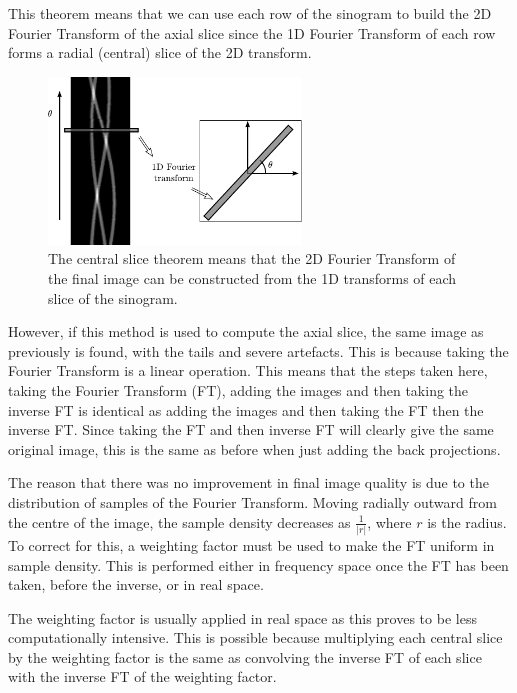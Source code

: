    This theorem means that we can use each row of the sinogram to build the 2D Fourier Transform of the axial slice since the 1D Fourier Transform of each row forms a radial (central) slice of the 2D transform.
    \begin{figure}[ht]
        \begin{center}
            \includegraphics[width=0.6\textwidth]{Files/report_images/central_slice_theorem.pdf}
        \end{center}
        \caption{The central slice theorem means that the 2D Fourier Transform of the final image can be constructed from the 1D transforms of each slice of the sinogram.\label{fig:central_slice_theorem}}
    \end{figure}

    However, if this method is used to compute the axial slice, the same image as previously is found, with the tails and severe artefacts. This is because taking the Fourier Transform is a linear operation. This means that the steps taken here, taking the Fourier Transform (FT), adding the images and then taking the inverse FT is identical as adding the images and then taking the FT then the inverse FT. Since taking the FT and then inverse FT will clearly give the same original image, this is the same as before when just adding the back projections.

    The reason that there was no improvement in  final image quality is due to the distribution of samples of the Fourier Transform. Moving radially outward from the centre of the image, the sample density decreases as $\frac{1}{|r|}$, where $r$ is the radius. To correct for this, a weighting factor must be used to make the FT uniform in sample density. This is performed either in frequency space once the FT has been taken, before the inverse, or in real space.

    The weighting factor is usually applied in real space as this proves to be less computationally intensive. This is possible because multiplying each central slice by the weighting factor is the same as convolving the inverse FT of each slice with the inverse FT of the weighting factor.

